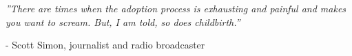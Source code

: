 \clearpage
\pagestyle{empty}  %

\null



\textit{
	\centering
   ''There are times when the adoption process is exhausting and painful and makes you want to scream. But, I am told, so does childbirth.''
}
\begin{flushright}
    - Scott Simon, journalist and radio broadcaster
\end{flushright}


\vfill\vfill\vfill\vfill\vfill\null